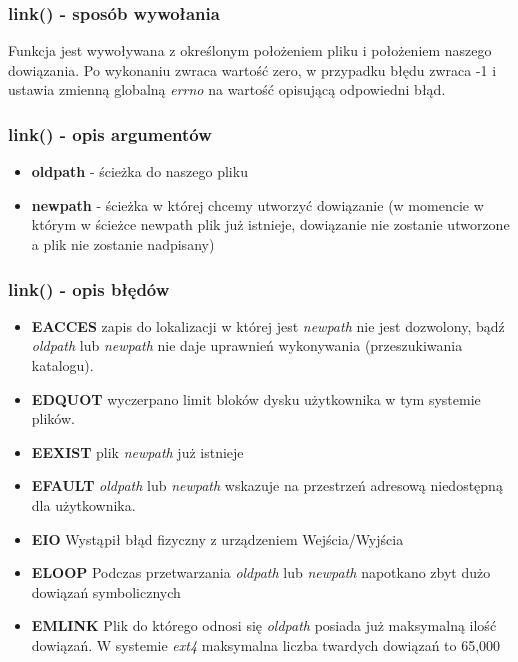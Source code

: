 \documentclass{beamer}
\begin{document}
\begin{frame}
	\frametitle{link() - sposób wywołania}
Funkcja jest wywoływana z określonym położeniem pliku i położeniem naszego dowiązania. Po wykonaniu zwraca wartość zero, w przypadku błędu zwraca -1 i ustawia zmienną globalną \textit{errno} na wartość opisującą odpowiedni błąd.
\end{frame}

\begin{frame}
	\frametitle{link() - opis argumentów}
\begin{itemize}
\item \textbf{oldpath} - ścieżka do naszego pliku
\item \textbf{newpath} - ścieżka w której chcemy utworzyć dowiązanie (w momencie w którym w ścieżce newpath plik już istnieje, dowiązanie nie zostanie utworzone a plik nie zostanie nadpisany)
\end{itemize}
\end{frame}

\begin{frame}
	\frametitle{link() - opis błędów}
\begin{itemize}
\item \textbf{EACCES} zapis do lokalizacji w której jest \textit{newpath} nie jest dozwolony, bądź \textit{oldpath} lub \textit{newpath} nie daje uprawnień wykonywania (przeszukiwania katalogu).
\item \textbf{EDQUOT} wyczerpano limit bloków dysku użytkownika w tym systemie plików.
\item \textbf{EEXIST} plik \textit{newpath} już istnieje
\item \textbf{EFAULT} \textit{oldpath} lub \textit{newpath} wskazuje na przestrzeń adresową niedostępną dla użytkownika.
\item \textbf{EIO} Wystąpił błąd fizyczny z urządzeniem Wejścia/Wyjścia
\item \textbf{ELOOP} Podczas przetwarzania \textit{oldpath} lub \textit{newpath} napotkano zbyt dużo dowiązań symbolicznych
\item \textbf{EMLINK} Plik do którego odnosi się \textit{oldpath} posiada już maksymalną ilość dowiązań. W systemie \textit{ext4} maksymalna liczba twardych dowiązań to 65,000 
\end{itemize}
\end{frame}
\end{document}
